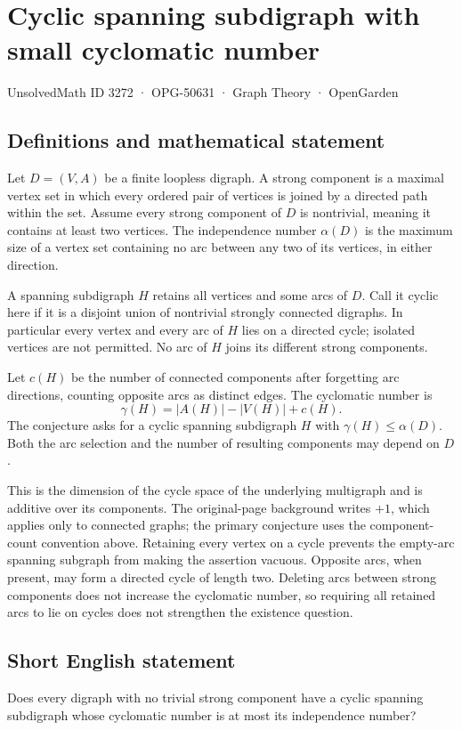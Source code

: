 \documentclass[11pt,a4paper]{article}
\begin{document}
\section*{Cyclic spanning subdigraph with small cyclomatic number}\label{3272}
{\small UnsolvedMath ID 3272 · OPG-50631 · Graph Theory · OpenGarden}
\subsection{Definitions and mathematical statement}
Let $D=(V,A)$ be a finite loopless digraph. A strong component is a maximal vertex set in which every ordered pair of vertices is joined by a directed path within the set. Assume every strong component of $D$ is nontrivial, meaning it contains at least two vertices. The independence number $\alpha(D)$ is the maximum size of a vertex set containing no arc between any two of its vertices, in either direction.

A spanning subdigraph $H$ retains all vertices and some arcs of $D$. Call it cyclic here if it is a disjoint union of nontrivial strongly connected digraphs. In particular every vertex and every arc of $H$ lies on a directed cycle; isolated vertices are not permitted. No arc of $H$ joins its different strong components.

Let $c(H)$ be the number of connected components after forgetting arc directions, counting opposite arcs as distinct edges. The cyclomatic number is
\[
                    \gamma(H)=|A(H)|-|V(H)|+c(H).
\]
The conjecture asks for a cyclic spanning subdigraph $H$ with $\gamma(H)\le\alpha(D)$. Both the arc selection and the number of resulting components may depend on $D$.

This is the dimension of the cycle space of the underlying multigraph and is additive over its components. The original-page background writes $+1$, which applies only to connected graphs; the primary conjecture uses the component-count convention above. Retaining every vertex on a cycle prevents the empty-arc spanning subgraph from making the assertion vacuous. Opposite arcs, when present, may form a directed cycle of length two. Deleting arcs between strong components does not increase the cyclomatic number, so requiring all retained arcs to lie on cycles does not strengthen the existence question.
\subsection{Short English statement}
Does every digraph with no trivial strong component have a cyclic spanning subdigraph whose cyclomatic number is at most its independence number?
\end{document}
